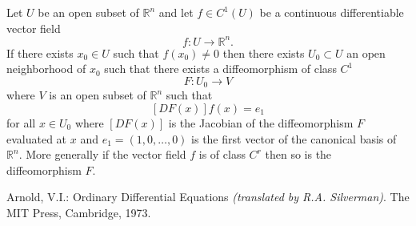 \documentclass[12pt]{article}
\begin{document}
Let $U$ be an open subset of $\mathbb{R}^n$ and let $f\in C^1(U)$ be a continuous differentiable vector field
$$f\colon U \to \mathbb{R}^n.$$
If there exists $x_0\in U$ such that $f(x_0)\neq 0$ then there exists $U_0\subset U$ an open neighborhood of $x_0$ such that there exists a diffeomorphism of class $C^1$
$$F\colon U_0 \to V$$
where $V$ is an open subset of $\mathbb{R}^n$ such that 
$$[DF(x)]f(x)=e_1$$
for all $x\in U_0$ where $[DF(x)]$ is the Jacobian of the diffeomorphism $F$ evaluated at $x$ and $e_1=(1,0,\ldots,0)$ is the first vector of the canonical basis of $\mathbb{R}^n$.  More generally if the vector field $f$ is of class $C^r$ then so is the diffeomorphism $F$. \cite{AVI}

\begin{thebibliography}{1}
  Arnold, V.I.: Ordinary Differential Equations \textit{(translated by R.A. Silverman)}.  The MIT Press, Cambridge, 1973.
\end{thebibliography}
\end{document}
